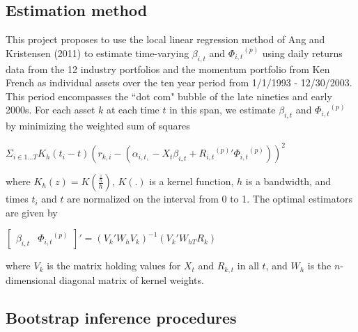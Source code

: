 \documentclass{article}
\begin{document}
\subsection*{Estimation method}
This project proposes to use the local linear regression method of Ang and Kristensen (2011) to estimate time-varying \(\beta_{i,t}\) and  \({\Phi_{i,t}}^{(p)}\) using daily returns data from the 12 industry portfolios and the momentum portfolio from Ken French as individual assets over the ten year period from 1/1/1993 - 12/30/2003. This period encompasses the ``dot com" bubble of the late nineties and early 2000s. For each asset \(k\) at each time \(t\) in this span, we estimate \(\beta_{i,t}\) and  \({\Phi_{i,t}}^{(p)}\)  by minimizing the weighted sum of squares 
\newline
\begin{center}\(\Sigma_{i \in 1...T} K_{h}(t_{i} - t) (r_{k,i} - (\alpha_{i,t,} - X_{t}\beta_{i,t} + {{R_{i,t}}^{(p)}}' {\Phi_{i,t}}^{(p)}))^{2}\)\end{center}
where \(K_{h}(z) = K(\frac{\frac{z}{h}}{h})\), \(K(.)\) is a kernel function, \(h\) is a bandwidth, and times \(t_{i}\) and \(t\) are normalized on the interval from 0 to 1. The optimal estimators are given by 
\newline
\begin{center}\({\begin{bmatrix}\beta_{i,t} &{\Phi_{i,t}}^{(p)}\end{bmatrix}}' = ({V_{k}}'W_{h}V_{k})^{-1}(V_{k}'W_{hT}R_{k})\)\end{center}
where \(V_{k}\) is the matrix holding values for \(X_{t}\)  and \(R_{k,t}\) in all \(t\), and \(W_{h}\) is the \(n\)-dimensional diagonal matrix of kernel weights.

\subsection*{Bootstrap inference procedures}
\end{document}
